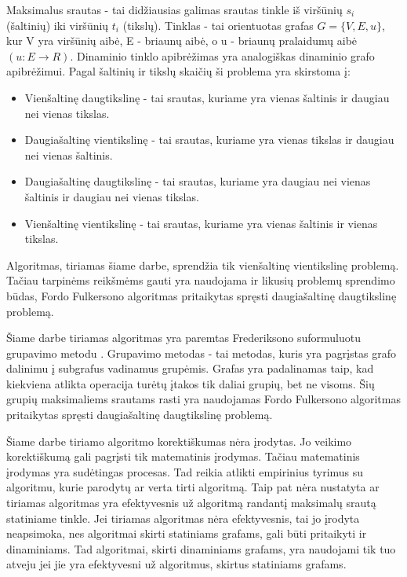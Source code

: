 Maksimalus srautas - tai didžiausias galimas srautas tinkle iš viršūnių $s_i$ (šaltinių) iki viršūnių $t_i$ (tikslų). Tinklas - tai orientuotas grafas $G= \{V, E, u\}$, kur V yra viršūnių aibė, E - briaunų aibė, o u - briaunų pralaidumų aibė $( u : E \rightarrow R )$. Dinaminio tinklo apibrėžimas yra analogiškas dinaminio grafo apibrėžimui. Pagal šaltinių ir tikslų skaičių ši problema yra skirstoma į:
\begin{itemize}
	\item Vienšaltinę daugtikslinę - tai srautas, kuriame yra vienas šaltinis ir daugiau nei vienas tikslas.
	\item Daugiašaltinę vientikslinę - tai srautas, kuriame yra vienas tikslas ir daugiau nei vienas šaltinis.
	\item Daugiašaltinę daugtikslinę - tai srautas, kuriame yra daugiau nei vienas šaltinis ir daugiau nei vienas tikslas.
	\item Vienšaltinę vientikslinę - tai srautas, kuriame yra vienas šaltinis ir vienas tikslas.
\end{itemize}
Algoritmas, tiriamas šiame darbe, sprendžia tik vienšaltinę vientikslinę problemą. Tačiau tarpinėms reikšmėms gauti yra naudojama ir likusių problemų sprendimo būdas, Fordo Fulkersono algoritmas pritaikytas spręsti daugiašaltinę daugtikslinę problemą.

Šiame darbe tiriamas algoritmas yra paremtas Frederiksono suformuluotu grupavimo metodu \cite{DSfUoMST}. Grupavimo metodas - tai metodas, kuris yra pagrįstas grafo dalinimu į subgrafus vadinamus grupėmis. Grafas yra padalinamas taip, kad kiekviena atlikta operacija turėtų įtakos tik daliai grupių, bet ne visoms. Šių grupių maksimaliems srautams rasti yra naudojamas Fordo Fulkersono algoritmas pritaikytas spręsti daugiašaltinę daugtikslinę problemą.

Šiame darbe tiriamo algoritmo korektiškumas nėra įrodytas. Jo veikimo korektiškumą gali pagrįsti tik matematinis įrodymas. Tačiau matematinis įrodymas yra sudėtingas procesas. Tad reikia atlikti empirinius tyrimus su algoritmu, kurie parodytų ar verta tirti algoritmą. Taip pat nėra nustatyta ar tiriamas algoritmas yra efektyvesnis už algoritmą randantį maksimalų srautą statiniame tinkle. Jei tiriamas algoritmas nėra efektyvesnis, tai jo įrodyta neapsimoka, nes algoritmai skirti statiniams grafams, gali būti pritaikyti ir dinaminiams. Tad algoritmai, skirti dinaminiams grafams, yra naudojami tik tuo atveju jei jie yra efektyvesni už algoritmus, skirtus statiniams grafams.

